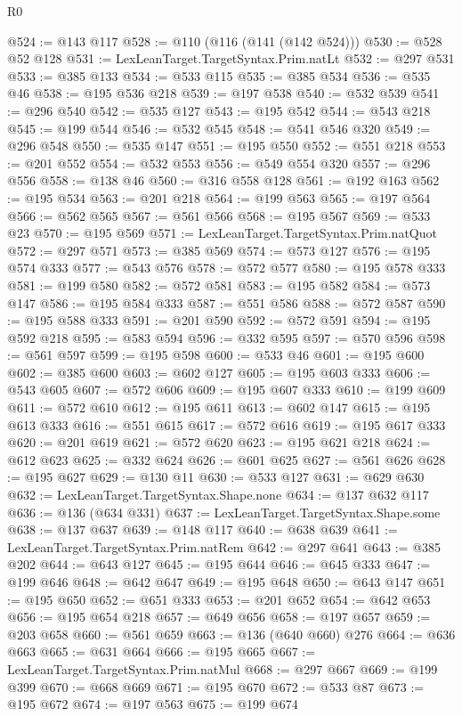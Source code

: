 \begin{lexlean}{R0}
\begin{coremodule}
@524 := @143 @117
@528 := @110 (@116 (@141 (@142 @524)))
@530 := @528 @52 @128
@531 := LexLeanTarget.TargetSyntax.Prim.natLt
@532 := @297 @531
@533 := @385 @133
@534 := @533 @115
@535 := @385 @534
@536 := @535 @46
@538 := @195 @536 @218
@539 := @197 @538
@540 := @532 @539
@541 := @296 @540
@542 := @535 @127
@543 := @195 @542
@544 := @543 @218
@545 := @199 @544
@546 := @532 @545
@548 := @541 @546 @320
@549 := @296 @548
@550 := @535 @147
@551 := @195 @550
@552 := @551 @218
@553 := @201 @552
@554 := @532 @553
@556 := @549 @554 @320
@557 := @296 @556
@558 := @138 @46
@560 := @316 @558 @128
@561 := @192 @163
@562 := @195 @534
@563 := @201 @218
@564 := @199 @563
@565 := @197 @564
@566 := @562 @565
@567 := @561 @566
@568 := @195 @567
@569 := @533 @23
@570 := @195 @569
@571 := LexLeanTarget.TargetSyntax.Prim.natQuot
@572 := @297 @571
@573 := @385 @569
@574 := @573 @127
@576 := @195 @574 @333
@577 := @543 @576
@578 := @572 @577
@580 := @195 @578 @333
@581 := @199 @580
@582 := @572 @581
@583 := @195 @582
@584 := @573 @147
@586 := @195 @584 @333
@587 := @551 @586
@588 := @572 @587
@590 := @195 @588 @333
@591 := @201 @590
@592 := @572 @591
@594 := @195 @592 @218
@595 := @583 @594
@596 := @332 @595
@597 := @570 @596
@598 := @561 @597
@599 := @195 @598
@600 := @533 @46
@601 := @195 @600
@602 := @385 @600
@603 := @602 @127
@605 := @195 @603 @333
@606 := @543 @605
@607 := @572 @606
@609 := @195 @607 @333
@610 := @199 @609
@611 := @572 @610
@612 := @195 @611
@613 := @602 @147
@615 := @195 @613 @333
@616 := @551 @615
@617 := @572 @616
@619 := @195 @617 @333
@620 := @201 @619
@621 := @572 @620
@623 := @195 @621 @218
@624 := @612 @623
@625 := @332 @624
@626 := @601 @625
@627 := @561 @626
@628 := @195 @627
@629 := @130 @11
@630 := @533 @127
@631 := @629 @630
@632 := LexLeanTarget.TargetSyntax.Shape.none
@634 := @137 @632 @117
@636 := @136 (@634 @331)
@637 := LexLeanTarget.TargetSyntax.Shape.some
@638 := @137 @637
@639 := @148 @117
@640 := @638 @639
@641 := LexLeanTarget.TargetSyntax.Prim.natRem
@642 := @297 @641
@643 := @385 @202
@644 := @643 @127
@645 := @195 @644
@646 := @645 @333
@647 := @199 @646
@648 := @642 @647
@649 := @195 @648
@650 := @643 @147
@651 := @195 @650
@652 := @651 @333
@653 := @201 @652
@654 := @642 @653
@656 := @195 @654 @218
@657 := @649 @656
@658 := @197 @657
@659 := @203 @658
@660 := @561 @659
@663 := @136 (@640 @660) @276
@664 := @636 @663
@665 := @631 @664
@666 := @195 @665
@667 := LexLeanTarget.TargetSyntax.Prim.natMul
@668 := @297 @667
@669 := @199 @399
@670 := @668 @669
@671 := @195 @670
@672 := @533 @87
@673 := @195 @672
@674 := @197 @563
@675 := @199 @674

\end{coremodule}
\end{lexlean}
